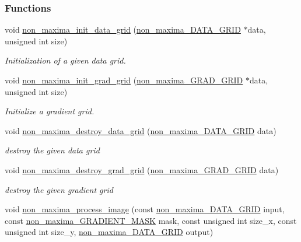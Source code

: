 \subsubsection*{Functions}
\begin{DoxyCompactItemize}
\item 
void \hyperlink{a00015_a919db0cf42f0d4598ab90ca27225b3cd}{non\-\_\-maxima\-\_\-init\-\_\-data\-\_\-grid} (\hyperlink{a00015_a5b3067f5dc305f04d5a7958013212c82}{non\-\_\-maxima\-\_\-\-D\-A\-T\-A\-\_\-\-G\-R\-I\-D} $\ast$data, unsigned int size)
\begin{DoxyCompactList}\small\item\em Initialization of a given data grid. \end{DoxyCompactList}\item 
void \hyperlink{a00015_a1cbba4fe538a208427941a14119e30e0}{non\-\_\-maxima\-\_\-init\-\_\-grad\-\_\-grid} (\hyperlink{a00015_ac46b96fbfbaedf0343eb3282eccb96e5}{non\-\_\-maxima\-\_\-\-G\-R\-A\-D\-\_\-\-G\-R\-I\-D} $\ast$data, unsigned int size)
\begin{DoxyCompactList}\small\item\em Initialize a gradient grid. \end{DoxyCompactList}\item 
void \hyperlink{a00015_a6eaea8cb64fc725f55711fefe7e898d5}{non\-\_\-maxima\-\_\-destroy\-\_\-data\-\_\-grid} (\hyperlink{a00015_a5b3067f5dc305f04d5a7958013212c82}{non\-\_\-maxima\-\_\-\-D\-A\-T\-A\-\_\-\-G\-R\-I\-D} data)
\begin{DoxyCompactList}\small\item\em destroy the given data grid \end{DoxyCompactList}\item 
void \hyperlink{a00015_ab8e1a180bb41eb19cf535a500c74496b}{non\-\_\-maxima\-\_\-destroy\-\_\-grad\-\_\-grid} (\hyperlink{a00015_ac46b96fbfbaedf0343eb3282eccb96e5}{non\-\_\-maxima\-\_\-\-G\-R\-A\-D\-\_\-\-G\-R\-I\-D} data)
\begin{DoxyCompactList}\small\item\em destroy the given gradient grid \end{DoxyCompactList}\item 
void \hyperlink{a00015_ab71ee6258c81f473f8d88203ebce5eef}{non\-\_\-maxima\-\_\-process\-\_\-image} (const \hyperlink{a00015_a5b3067f5dc305f04d5a7958013212c82}{non\-\_\-maxima\-\_\-\-D\-A\-T\-A\-\_\-\-G\-R\-I\-D} input, const \hyperlink{a00015_a7dd815a0a3b2d6f876ff33571eb2e12d}{non\-\_\-maxima\-\_\-\-G\-R\-A\-D\-I\-E\-N\-T\-\_\-\-M\-A\-S\-K} mask, const unsigned int size\-\_\-x, const unsigned int size\-\_\-y, \hyperlink{a00015_a5b3067f5dc305f04d5a7958013212c82}{non\-\_\-maxima\-\_\-\-D\-A\-T\-A\-\_\-\-G\-R\-I\-D} output)

\end{DoxyCompactItemize}
